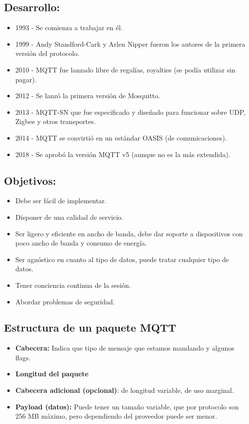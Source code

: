 \documentclass[12pt, twoside, openright]{report} %
\begin{document}
\subsection{Desarrollo:}
\begin{itemize}
	\item 1993 - Se comienza a trabajar en él.
	\item 1999 - Andy Standford-Cark y Arlen Nipper fueron los autores de la primera versión del protocolo.
	\item 2010 - MQTT fue lanzado libre de regalías, royalties (se podía utilizar sin pagar).
	\item 2012 - Se lanzó la primera versión de Mosquitto.
	\item 2013 - MQTT-SN que fue especificado y diseñado para funcionar sobre UDP, Zigbee y otros transportes.
	\item 2014 - MQTT se convirtió en un estándar OASIS (de comunicaciones).
	\item 2018 - Se aprobó la versión MQTT v5 (aunque no es la más extendida).
\end{itemize}

\subsection{Objetivos:}
\begin{itemize}
	\item Debe ser fácil de implementar.
	\item Disponer de una calidad de servicio.
	\item Ser ligero y eficiente en ancho de banda, debe dar soporte a dispositivos con poco ancho de banda y consumo de energía.
	\item Ser agnóstico en cuanto al tipo de datos, puede tratar cualquier tipo de datos.
	\item Tener conciencia continua de la sesión.
	\item Abordar problemas de seguridad.
\end{itemize}

\subsection{Estructura de un paquete MQTT}
\begin{itemize}
	\item \textbf{Cabecera:} Indica que tipo de mensaje que estamos mandando y algunos flags.
	\item \textbf{Longitud del paquete}
	\item \textbf{Cabecera adicional (opcional)}: de longitud variable, de uso marginal.
	\item \textbf{Payload (datos):} Puede tener un tamaño variable, que por protocolo son 256 MB máximo, pero dependiendo del proveedor puede ser menor.
\end{itemize}
\end{document}
